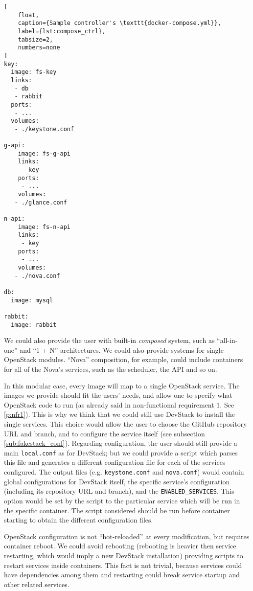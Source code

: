 \begin{lstlisting}[
	float,
	caption={Sample controller's \texttt{docker-compose.yml}},
	label={lst:compose_ctrl},
	tabsize=2,
	numbers=none
]
key:
  image: fs-key
  links:
   - db
   - rabbit
  ports:
   - ...
  volumes:
   - ./keystone.conf

g-api:
	image: fs-g-api
	links:
	 - key
	ports:
	 - ...
	volumes:
   - ./glance.conf

n-api:
	image: fs-n-api
	links:
	 - key
	ports:
	 - ...
	volumes:
   - ./nova.conf

db:
  image: mysql

rabbit:
  image: rabbit
\end{lstlisting}

We could also provide the user with built-in \emph{composed} system, such as ``all-in-one'' and ``1 + N'' architectures. We could also provide systems for single OpenStack modules. ``Nova'' composition, for example, could include containers for all of the Nova's services, such as the scheduler, the API and so on.

In this modular case, every image will map to a single OpenStack service. The images we provide should fit the users' needs, and allow one to specify what OpenStack code to run (as already said in non-functional requirement $1$. See \ref{p:nfr1}). This is why we think that we could still use DevStack to install the single services. This choice would allow the user to choose the GitHub repository URL and branch, and to configure the service itself (see subsection \ref{sub:fakestack_conf}). Regarding configuration, the user should still provide a main \texttt{local.conf} as for DevStack; but we could provide a script which parses this file and generates a different configuration file for each of the services configured. The output files (e.g. \texttt{keystone.conf} and \texttt{nova.conf}) would contain global configurations for DevStack itself, the specific service's configuration (including its repository URL and branch), and the \texttt{ENABLED\_SERVICES}. This option would be set by the script to the particular service which will be run in the specific container. The script considered should be run before container starting to obtain the different configuration files.

OpenStack configuration is not ``hot-reloaded'' at every modification, but requires container reboot. We could avoid rebooting (rebooting is heavier then service restarting, which would imply a new DevStack installation) providing scripts to restart services inside containers. This fact is not trivial, because services could have dependencies among them and restarting could break service startup and other related services. 


